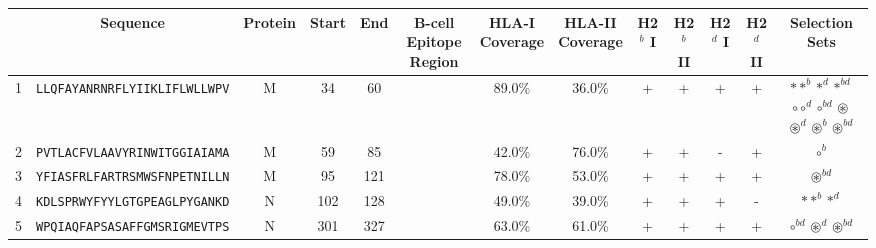 \begin{tabular}{rcccccccccccc}
\toprule
{} &                              Sequence & Protein &  Start &   End &                                            B-cell Epitope Region & \Centerstack{HLA-I \\ Coverage} & \Centerstack{HLA-II \\ Coverage} & H2$^{b}$ I & H2$^{b}$ II & H2$^{d}$ I & H2$^{d}$ II &                                                                                                                                 Selection Sets \\
\midrule
1  &  \texttt{LLQFAYANRNRFLYIIKLIFLWLLWPV} &       M &     34 &    60 &                                                                  &                          89.0\% &                           36.0\% &          + &           + &          + &           + &  \Centerstack{  $\ast \ast^b \ast^d \ast^{bd}$ \\  $\circ \circ^d \circ^{bd} \circledast$ \\  $\circledast^d \circledast^b \circledast^{bd}$ } \\
2  &  \texttt{PVTLACFVLAAVYRINWITGGIAIAMA} &       M &     59 &    85 &                                                                  &                          42.0\% &                           76.0\% &          + &           + &          - &           + &                                                                                                                                    $ \circ^b $ \\
3  &  \texttt{YFIASFRLFARTRSMWSFNPETNILLN} &       M &     95 &   121 &                                                                  &                          78.0\% &                           53.0\% &          + &           + &          + &           + &                                                                                                                           $ \circledast^{bd} $ \\
4  &  \texttt{KDLSPRWYFYYLGTGPEAGLPYGANKD} &       N &    102 &   128 &                                                                  &                          49.0\% &                           39.0\% &          + &           + &          + &           - &                                                                                                                         $ \ast \ast^b \ast^d $ \\
5  &  \texttt{WPQIAQFAPSASAFFGMSRIGMEVTPS} &       N &    301 &   327 &                                                                  &                          63.0\% &                           61.0\% &          + &           + &          + &           + &                                                                                                  $ \circ^{bd} \circledast^d \circledast^{bd} $ \\

\end{tabular}
